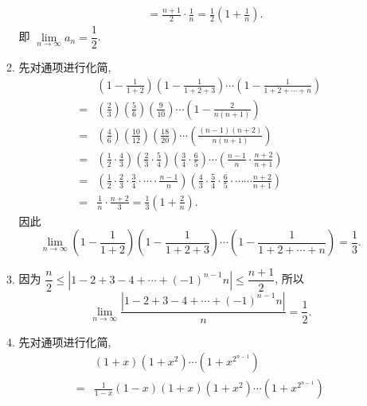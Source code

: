 \begin{enumerate}
\begin{enumerate}[(1)]
\begin{align*}
                        &= \frac{n+1}{2} \cdot \frac{1}{n} = \frac 12\left(1 + \frac 1n \right).
                \end{align*}
                即 $\lim\limits_{n\to\infty}a_n = \dfrac 12$.
            \item
                先对通项进行化简,
                \begin{align*}
                        & \left(1 - \frac{1}{1+2}\right)\left(1 - \frac{1}{1+2+3}\right)\cdots\left(1-\frac{1}{1+2+\cdots+n}\right) \\
                    ={} & \left(\frac{2}{3}\right)\left(\frac{5}{6}\right) \left(\frac{9}{10}\right) \cdots\left(1-\frac{2}{n(n+1)}\right) \\
                    ={} & \left(\frac{4}{6}\right) \left(\frac{10}{12}\right) \left(\frac{18}{20}\right) \cdots \left(\frac{(n-1)(n+2)}{n(n+1)}\right) \\
                    ={} & \left(\frac12 \cdot \frac43\right) \left(\frac23\cdot\frac54\right) \left(\frac34\cdot\frac65\right) \cdots \left(\frac{n-1}{n} \cdot \frac{n+2}{n+1}\right) \\
                    ={} & \left(\frac12 \cdot \frac23 \cdot \frac34 \cdot \cdots \cdot \frac{n-1}{n} \right)\left(\frac43 \cdot \frac54 \cdot \frac65 \cdot \cdots \cdots \frac{n+2}{n+1} \right) \\
                    ={} & \frac{1}{n} \cdot \frac{n+2}{3} = \frac 13 \left(1 + \frac 2n\right).
                \end{align*}
                因此
                \begin{equation*}
                    \lim\limits_{n\to\infty}\left(1 - \frac{1}{1+2}\right)\left(1 - \frac{1}{1+2+3}\right)\cdots\left(1-\frac{1}{1+2+\cdots+n}\right) = \frac13.
                \end{equation*}
            \item 
                因为 $\dfrac{n}{2} \leqslant |1-2+3-4+\cdots+(-1)^{n-1}n| \leqslant \dfrac{n+1}{2}$, 所以
                \[
                    \lim\limits_{n\to\infty}\frac{|1 - 2 + 3 - 4 + \cdots + (-1)^{n-1}n|}{n} = \frac 12.
                \]
            \item
                先对通项进行化简,
                \begin{align*}
                        & (1 + x)(1 + x^2) \cdots (1+x^{2^{n-1}}) \\
                    ={} & \frac{1}{1-x}(1 - x)(1 + x)(1 + x^2) \cdots (1 + x^{2^{n-1}}) \\

\end{align*}
\end{enumerate}
\end{enumerate}
